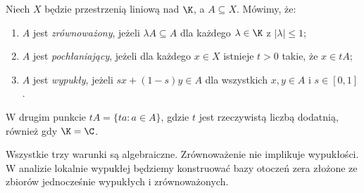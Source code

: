 \begin{definicja}\label{def:balanced-absorbing}
Niech $X$ będzie przestrzenią liniową nad $\K$, a $A\subseteq X$.
Mówimy, że:
\begin{enumerate}[label=\textup{(\roman*)}]
 \item $A$ jest \emph{zrównoważony}, jeżeli $\lambda A\subseteq A$
       dla każdego $\lambda\in\K$ z $|\lambda|\leq1$;
 \item $A$ jest \emph{pochłaniający}, jeżeli dla każdego $x\in X$
       istnieje $t>0$ takie, że $x\in tA$;
 \item $A$ jest \emph{wypukły}, jeżeli $sx+(1-s)y\in A$
       dla wszystkich $x,y\in A$ i $s\in[0,1]$.
\end{enumerate}
W drugim punkcie $tA=\{ta:a\in A\}$, gdzie $t$ jest rzeczywistą
liczbą dodatnią, również gdy $\K=\C$.
\end{definicja}

\begin{uwaga}
Wszystkie trzy warunki są algebraiczne. Zrównoważenie nie
implikuje wypukłości. W analizie lokalnie wypukłej będziemy
konstruować bazy otoczeń zera złożone ze zbiorów jednocześnie
wypukłych i zrównoważonych.
\end{uwaga}

